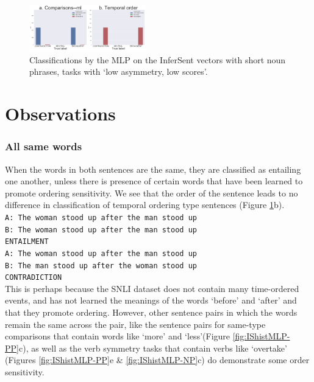 \documentclass[10pt,letterpaper]{article}
\begin{document}
\begin{figure}[ht!]
\centering
\includegraphics[width=0.45\textwidth]{NNShortHistsInferSentMLP.png}
\caption{Classifications by the MLP on the InferSent vectors with short noun phrases, tasks with `low asymmetry, low scores'.}
\label{fig:IShistMLP-NN}
\end{figure}



\section{Observations}

\subsubsection{All same words}
When the words in both sentences are the same, they are classified as entailing one another, unless there is presence of certain words that have been learned to promote ordering sensitivity. We see that the order of the sentence leads to no difference in classification of temporal ordering type sentences (Figure \ref{fig:IShistMLP-NN}b).\\
{\tt  A: The woman stood up after the man stood up \\ B: The woman stood up after the man stood up \\ ENTAILMENT \\}{\tt A: The woman stood up after the man stood up \\ B: The man stood up after the woman stood up \\ CONTRADICTION}\\
This is perhaps because the SNLI dataset does not contain many time-ordered events, and has not learned the meanings of the words `before' and `after' and that they promote ordering. However, other sentence pairs in which the words remain the same across the pair, like the sentence pairs for same-type comparisons that contain words like `more' and `less'(Figure \ref{fig:IShistMLP-PP}c), as well as the verb symmetry tasks that contain verbs like `overtake' (Figures \ref{fig:IShistMLP-PP}e \& \ref{fig:IShistMLP-NP}c) do demonstrate some order sensitivity.
\end{document}
